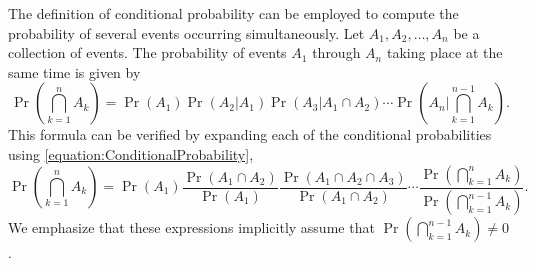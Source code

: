 The definition of conditional probability can be employed to compute the probability of several events occurring simultaneously.
Let $A_1, A_2, \ldots, A_n$ be a collection of events.
The probability of events $A_1$ through $A_n$ taking place at the same time is given by
\begin{equation} \label{equation:SimultaneousEvents}
\Pr \left( \bigcap_{k=1}^n A_k \right)
= \Pr (A_1) \Pr (A_2 | A_1) \Pr (A_3 | A_1 \cap A_2)
\cdots \Pr \left( A_n \bigg| \bigcap_{k=1}^{n-1} A_k \right) .
\end{equation}
This formula can be verified by expanding each of the conditional probabilities using \eqref{equation:ConditionalProbability},
\begin{equation*}
\Pr \left( \bigcap_{k=1}^n A_k \right)
= \Pr (A_1) \frac{\Pr (A_1 \cap A_2)}{\Pr (A_1)}
\frac{\Pr (A_1 \cap A_2 \cap A_3)}{\Pr (A_1 \cap A_2)}
\cdots \frac{\Pr \left( \bigcap_{k=1}^{n} A_k \right)}
{\Pr \left( \bigcap_{k=1}^{n-1} A_k \right)} .
\end{equation*}
We emphasize that these expressions implicitly assume that $\Pr \left( \bigcap_{k=1}^{n-1} A_k \right) \neq 0$.

